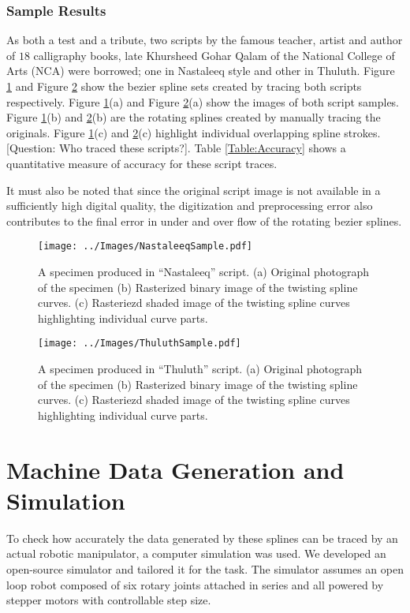 \subsubsection{Sample Results}
As both a test and a tribute, two scripts by the famous teacher, artist and author of $18$ calligraphy books, late Khursheed Gohar Qalam \cite{bib23} of the National College of Arts (NCA) were borrowed; one in Nastaleeq style and other in Thuluth. Figure \ref{Fig:Nastaleeq} and Figure \ref{Fig:Thuluth} show the bezier spline sets created by tracing both scripts respectively. Figure \ref{Fig:Nastaleeq}(a) and Figure \ref{Fig:Thuluth}(a) show the images of both script samples. Figure \ref{Fig:Nastaleeq}(b) and \ref{Fig:Thuluth}(b) are the rotating splines created by manually tracing the originals. Figure \ref{Fig:Nastaleeq}(c) and \ref{Fig:Thuluth}(c) highlight individual overlapping spline strokes. [Question: Who traced these scripts?]. Table \ref{Table:Accuracy} shows a quantitative measure of accuracy for these script traces.

It must also be noted that since the original script image is not available in a sufficiently high digital quality, the digitization and preprocessing error also contributes to the final error in under and over flow of the rotating bezier splines.

    \begin{figure}[!t]
    \centering
    \texttt{[image: ../Images/NastaleeqSample.pdf]}
      \caption{
        A specimen produced in ``Nastaleeq'' script. (a) Original photograph of the specimen (b) Rasterized binary image of the twisting spline curves. (c) Rasteriezd shaded image of the twisting spline curves highlighting individual curve parts.}
      \label{Fig:Nastaleeq}
    \end{figure}


    \begin{figure}[!t]
    \centering
    \texttt{[image: ../Images/ThuluthSample.pdf]}
    \caption{
        A specimen produced in ``Thuluth'' script. (a) Original photograph of the specimen (b) Rasterized binary image of the twisting spline curves. (c) Rasteriezd shaded image of the twisting spline curves highlighting individual curve parts.
    }
  \label{Fig:Thuluth}
\end{figure}

\section{Machine Data Generation and Simulation}
\label{Chapter:Simulation}
    To check how accurately the data generated by these splines can be traced by an actual robotic manipulator, a computer simulation was used. We developed an open-source simulator and tailored it for the task. The simulator assumes an open loop robot composed of six rotary joints attached in series and all powered by stepper motors with controllable step size. 
    
